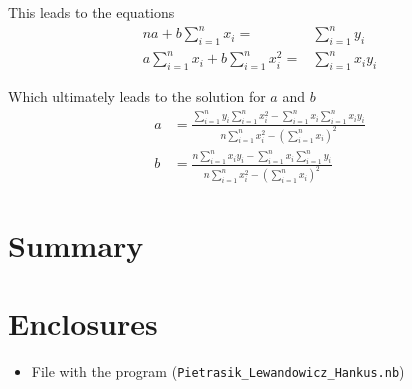 \documentclass{MathematicaReport}
\begin{document}
This leads to the equations
\begin{equation*}
	\begin{aligned}
		na + b \sum_{i=1}^{n} x_i	= & \sum_{i=1}^{n} y_i \\
		a \sum_{i=1}^{n} x_i + b \sum_{i=1}^{n} x_i^2 = & \sum_{i=1}^{n} x_i y_i
	\end{aligned}
\end{equation*}

Which ultimately leads to the solution for \( a \) and \( b \)
\begin{equation*}
	\begin{aligned}
	a & = \frac{\sum_{i=1}^{n}y_i\sum_{i=1}^{n}x_i^2-\sum_{i=1}^{n}x_i\sum_{i=1}^{n}x_iy_i}{n\sum_{i=1}^{n}x_i^2-(\sum_{i=1}^{n}x_i)^2} \\
	b & = \frac{n\sum_{i=1}^{n}x_iy_i-\sum_{i=1}^{n}x_i\sum_{i=1}^{n}y_i}{n\sum_{i=1}^{n}x_i^2-(\sum_{i=1}^{n}x_i)^2}
	\end{aligned}
\end{equation*}


\section{Summary}

\section*{Enclosures} 
\begin{itemize}
	\item File with the program (\texttt{Pietrasik\_Lewandowicz\_Hankus.nb})
\end{itemize}
\end{document}
